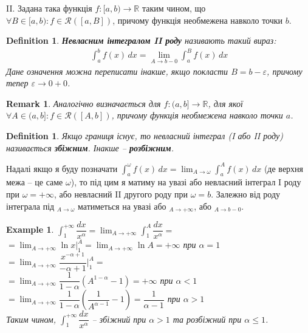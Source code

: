 \documentclass[a4paper, 10pt]{article}
\def\huge{\displaystyle}
\theoremstyle{theoremdd}
\theoremstyle{theoremdd}
\theoremstyle{theoremdd}
\newtheorem{definition}[theorem]{Definition}
\theoremstyle{theoremdd}
\theoremstyle{theoremdd}
\newtheorem{example}[theorem]{Example}
\theoremstyle{theoremdd}
\theoremstyle{theoremdd}
\newtheorem{remark}[theorem]{Remark}
\theoremstyle{theoremdd}
\theoremstyle{theoremdd}
\begin{document}
II. Задана така функція $f \colon [a,b) \to \mathbb{R}$ таким чином, що $\forall B \in [a,b): f \in \mathcal{R}([a,B])$, причому функція необмежена навколо точки $b$.
\begin{definition}
\textbf{Невласним інтегралом II роду} називають такий вираз:
\begin{align*}
\int_a^b f(x)\,dx = \lim_{A \to b-0} \int_a^{B} f(x)\,dx
\end{align*}
Дане означення можна переписати інакше, якщо покласти $B = b-\varepsilon$, причому тепер $\varepsilon \to 0+0$.
\end{definition}

\begin{remark}
Аналогічно визначається для $f \colon (a,b] \to \mathbb{R}$, для якої $\forall A \in (a,b]: f \in \mathcal{R}([A,b])$, причому функція необмежена навколо точки $a$.
\end{remark}

\begin{definition}
Якщо границя існує, то невласний інтеграл (I або II роду) називається \textbf{збіжним}. Інакше -- \textbf{розбіжним}.
\end{definition}

Надалі якщо я буду позначати $\displaystyle\int_a^\omega f(x)\,dx = \displaystyle\lim_{A \to \omega} \int_a^A f(x)\,dx$ (де верхня межа -- це саме $\omega$), то під цим я матиму на увазі або невласний інтеграл I роду при $\omega = +\infty$, або невласний II другого роду при $\omega = b$. Залежно від роду інтеграла під ${}_{A \to \omega}$ матиметься на увазі або ${}_{A \to +\infty}$, або ${}_{A \to b-0}$.

\begin{example}
$\huge\int_1^{+\infty} \dfrac{dx}{x^\alpha} = \huge\lim_{A \to +\infty} \int_1^A \dfrac{dx}{x^\alpha} \boxed{=}$\\
$= \huge\lim_{A \to +\infty} \ln x \Big|_1^A = \lim_{A \to +\infty} \ln A = +\infty$ при $\alpha = 1$\\
$= \huge\lim_{A \to +\infty} \dfrac{x^{-\alpha+1}}{-\alpha+1} \Big|_1^A =$\\
$= \huge\lim_{A \to +\infty} \dfrac{1}{1-\alpha} \left(A^{1-\alpha} - 1 \right) = +\infty$ при $\alpha < 1$\\
$= \huge\lim_{A \to +\infty} \dfrac{1}{1-\alpha} \left(\dfrac{1}{A^{\alpha-1}} - 1\right) = \dfrac{1}{\alpha - 1}$ при $\alpha > 1$\\
Таким чином, $\huge\int_1^{+\infty} \dfrac{dx}{x^\alpha}$ -- збіжний при $\alpha > 1$ та розбіжний при $\alpha \leq 1$.
\end{example}
\end{document}
